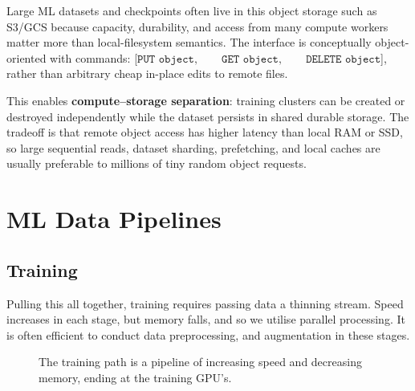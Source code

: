 Large ML datasets and checkpoints often live in this object storage such as S3/GCS because capacity, durability, and access from many compute workers matter more than local-filesystem semantics.
The interface is conceptually object-oriented with commands: [$\texttt{PUT object},\qquad \texttt{GET object},\qquad \texttt{DELETE object}$], rather than arbitrary cheap in-place edits to remote files.

This enables \textbf{compute--storage separation}: training clusters can be created or destroyed independently while the dataset persists in shared durable storage.
The tradeoff is that remote object access has higher latency than local RAM or SSD, so large sequential reads, dataset sharding, prefetching, and local caches are usually preferable to millions of tiny random object requests.

\section{ML Data Pipelines}
\label{sec:training-data-pipeline}
\label{sec:online-inference-data}

\subsection{Training}
Pulling this all together, training requires passing data a thinning stream. 
Speed increases in each stage, but memory falls, and so we utilise parallel processing.
It is often efficient to conduct data preprocessing, and augmentation in these stages. 

\begin{figure}[htbp]
\centering
{}
\caption{The training path is a pipeline of increasing speed and decreasing memory, ending at the training GPU's.}
\label{fig:training-input-path}
\end{figure}

